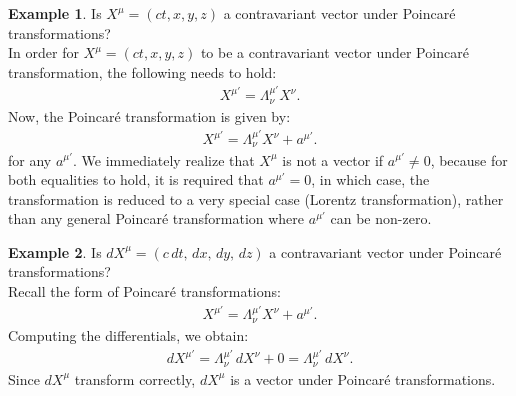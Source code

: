 \documentclass{book}
\theoremstyle{definition}
\newtheorem{exmp}{Example}[section]
\begin{document}
\begin{exmp}
	Is $X^\mu = (ct,x,y,z)$ a contravariant vector under Poincar\'e transformations?\\
	
	In order for $X^\mu = (ct,x,y,z)$ to be a contravariant vector under Poincar\'e transformation, the following needs to hold:
	\begin{align*}
	X^{\mu'} = \Lambda^{\mu'}_\nu X^\nu.
	\end{align*}
	Now, the Poincar\'e transformation is given by:
	\begin{align*}
	X^{\mu'} = \Lambda^{\mu'}_\nu X^\nu + a^{\mu'}.
	\end{align*}
	for any $a^{\mu'}$. We immediately realize that $X^\mu$ is not a vector if $a^{\mu'} \neq 0$, because for both equalities to hold, it is required that $a^{\mu'} = 0$, in which case, the transformation is reduced to a very special case (Lorentz transformation), rather than any general Poincar\'e transformation where $a^{\mu'}$ can be non-zero.  	\\
\end{exmp}

\begin{exmp}
	Is $dX^\mu = (c\,dt, \,dx, \,dy, \,dz)$ a contravariant vector under Poincar\'e transformations?\\
	
	Recall the form of Poincar\'e transformations:
	\begin{align*}
	X^{\mu'} = \Lambda^{\mu'}_\nu X^\nu + a^{\mu'}.
	\end{align*}
	Computing the differentials, we obtain:
	\begin{align*}
	dX^{\mu'} = \Lambda^{\mu'}_\nu\,dX^\nu + 0 = \Lambda^{\mu'}_\nu\,dX^\nu.
	\end{align*}
	Since $dX^{\mu}$ transform correctly, $dX^\mu$ is a vector under Poincar\'e transformations. \\
\end{exmp}
\end{document}
